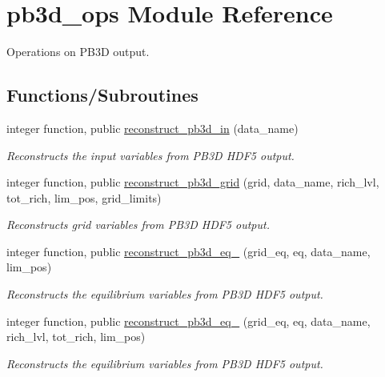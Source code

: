 \hypertarget{namespacepb3d__ops}{}\section{pb3d\+\_\+ops Module Reference}
\label{namespacepb3d__ops}


Operations on P\+B3D output.  


\subsection*{Functions/\+Subroutines}
\begin{DoxyCompactItemize}
\item 
integer function, public \hyperlink{namespacepb3d__ops_ad1481747b9b9832f816d4bf1dd2d6737}{reconstruct\+\_\+pb3d\+\_\+in} (data\+\_\+name)
\begin{DoxyCompactList}\small\item\em Reconstructs the input variables from P\+B3D H\+D\+F5 output. \end{DoxyCompactList}\item 
integer function, public \hyperlink{namespacepb3d__ops_a4218b582c5029ff05893265fa329877b}{reconstruct\+\_\+pb3d\+\_\+grid} (grid, data\+\_\+name, rich\+\_\+lvl, tot\+\_\+rich, lim\+\_\+pos, grid\+\_\+limits)
\begin{DoxyCompactList}\small\item\em Reconstructs grid variables from P\+B3D H\+D\+F5 output. \end{DoxyCompactList}\item 
integer function, public \hyperlink{namespacepb3d__ops_a3142ca9965fa01b2777db762ed1a6eba}{reconstruct\+\_\+pb3d\+\_\+eq\+\_} (grid\+\_\+eq, eq, data\+\_\+name, lim\+\_\+pos)
\begin{DoxyCompactList}\small\item\em Reconstructs the equilibrium variables from P\+B3D H\+D\+F5 output. \end{DoxyCompactList}\item 
integer function, public \hyperlink{namespacepb3d__ops_aaf99ae865680f4cf0a0a9932786689bf}{reconstruct\+\_\+pb3d\+\_\+eq\+\_} (grid\+\_\+eq, eq, data\+\_\+name, rich\+\_\+lvl, tot\+\_\+rich, lim\+\_\+pos)
\begin{DoxyCompactList}\small\item\em Reconstructs the equilibrium variables from P\+B3D H\+D\+F5 output. \end{DoxyCompactList}\item 

\end{DoxyCompactItemize}
